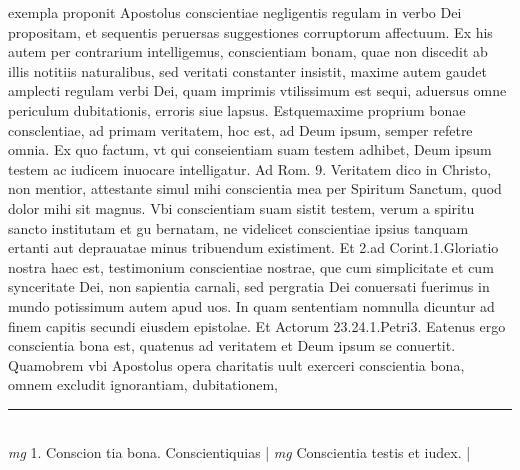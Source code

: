 \documentclass{article}
\begin{document}
\begin{pages}
exempla proponit Apostolus conscientiae negligentis regulam in verbo Dei propositam, et sequentis peruersas suggestiones corruptorum affectuum. Ex his autem per contrarium intelligemus, conscientiam bonam, quae non discedit ab illis notitiis naturalibus, sed veritati constanter insistit, maxime autem gaudet amplecti regulam verbi Dei, quam imprimis vtilissimum est sequi, aduersus omne periculum dubitationis, erroris siue lapsus. Estquemaxime proprium bonae consclentiae, ad primam veritatem, hoc est, ad Deum ipsum, semper refetre omnia. Ex quo factum, vt qui conseientiam suam testem adhibet, Deum ipsum testem ac iudicem inuocare intelligatur. Ad Rom. 9. Veritatem dico in Christo, non mentior, attestante simul mihi conscientia mea per Spiritum Sanctum, quod dolor mihi sit magnus. Vbi conscientiam suam sistit testem, verum a spiritu sancto institutam et gu   bernatam, ne videlicet conscientiae ipsius tanquam ertanti aut deprauatae minus tribuendum existiment. Et 2.ad Corint.1.Gloriatio nostra haec est, testimonium conscientiae nostrae, que    cum simplicitate et cum synceritate Dei, non sapientia carnali, sed pergratia Dei conuersati   fuerimus in mundo potissimum autem apud uos. In quam sententiam nomnulla dicuntur ad finem   capitis secundi eiusdem epistolae. Et Actorum 23.24.1.Petri3. Eatenus ergo conscientia bona est, quatenus ad veritatem et Deum ipsum se conuertit. Quamobrem vbi Apostolus opera charitatis uult exerceri conscientia bona, omnem excludit ignorantiam, dubitationem,  \pend
\vspace{0.5cm}\noindent
\vspace{0.2cm}\rule{1cm}{0.2pt}\\ 
\hspace{0.2cm}\textit{mg}
\footnotesize 1. Conscion tia bona. Conscientiquias 
\normalsize| 
\hspace{0.2cm}\textit{mg}
\footnotesize Conscientia testis et iudex. 
\normalsize| 

\end{pages}
\end{document}
